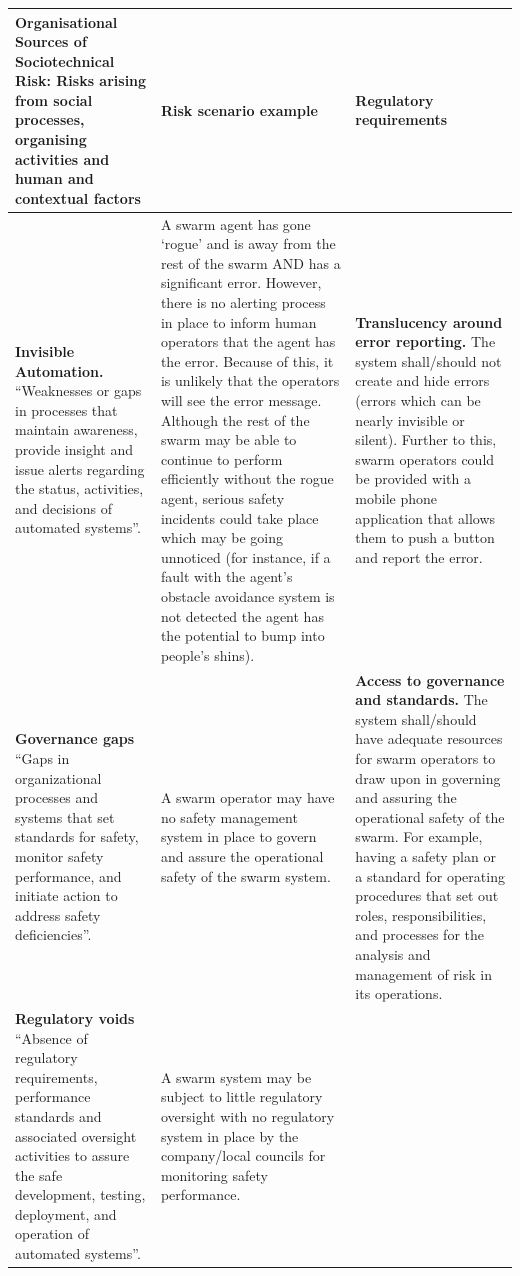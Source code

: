 \documentclass[lettersize,journal]{IEEEtran}
\begin{document}
\begin{landscape}
\begin{table}[]
    \centering
    \begin{tabular}{|p{0.3\textheight}|p{0.35\textheight}|p{0.35\textheight}|}
    \hline
   \textbf{Organisational Sources of Sociotechnical Risk:} Risks arising from social processes, organising activities and human and contextual factors & \textbf{Risk scenario example} & \textbf{Regulatory requirements}\\
   \hline
   \textbf{Invisible Automation.} ``Weaknesses or gaps in processes that maintain awareness, provide insight and issue alerts regarding the status, activities, and decisions of automated systems”. \cite{macrae2021learning} & A swarm agent has gone ‘rogue’ and is away from the rest of the swarm AND has a significant error. However, there is no alerting process in place to inform human operators that the agent has the error. Because of this, it is unlikely that the operators will see the error message. Although the rest of the swarm may be able to continue to perform efficiently without the rogue agent, serious safety incidents could take place which may be going unnoticed (for instance, if a fault with the agent’s obstacle avoidance system is not detected the agent has the potential to bump into people’s shins).	& \textbf{Translucency around error reporting.} The system shall/should not create and hide errors (errors which can be nearly invisible or silent). Further to this, swarm operators could be provided with a mobile phone application that allows them to push a button and report the error.\\
   \hline
   \textbf{Governance gaps} ``Gaps in organizational processes and systems that set standards for safety, monitor safety performance, and initiate action to address safety deficiencies”. \cite{macrae2021learning} & A swarm operator may have no safety management system in place to govern and assure the operational safety of the swarm system. &\textbf{Access to governance and standards.} The system shall/should have adequate resources for swarm operators to draw upon in governing and assuring the operational safety of the swarm. For example, having a safety plan or a standard for operating procedures that set out roles, responsibilities, and processes for the analysis and management of risk in its operations.
   \\
   \hline
   \textbf{Regulatory voids} ``Absence of regulatory requirements, performance standards and associated oversight activities to assure the safe development, testing, deployment, and operation of automated systems”. \cite{macrae2021learning} & A swarm system may be subject to little regulatory oversight with no regulatory system in place by the company/local councils for monitoring safety performance.&

\end{tabular}
\end{table}
\end{landscape}
\end{document}
